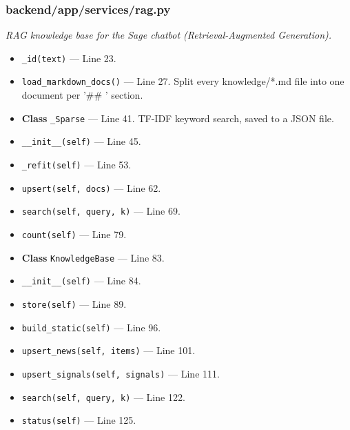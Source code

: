 \subsubsection*{backend/app/services/rag.py}
\textit{RAG knowledge base for the Sage chatbot (Retrieval-Augmented Generation).}
\begin{itemize}[nosep,leftmargin=1.5em]
\item \texttt{\_\allowbreak{}id(\allowbreak{}text)} --- Line 23.
\item \texttt{load\_\allowbreak{}markdown\_\allowbreak{}docs(\allowbreak{})} --- Line 27. Split every knowledge/*.md file into one document per '\#\# ' section.
\item \textbf{Class} \texttt{\_\allowbreak{}Sparse} --- Line 41. TF-IDF keyword search, saved to a JSON file.
\item \hspace*{1em}\texttt{\_\allowbreak{}\_\allowbreak{}init\_\allowbreak{}\_\allowbreak{}(\allowbreak{}self)} --- Line 45.
\item \hspace*{1em}\texttt{\_\allowbreak{}refit(\allowbreak{}self)} --- Line 53.
\item \hspace*{1em}\texttt{upsert(\allowbreak{}self,\allowbreak{} docs)} --- Line 62.
\item \hspace*{1em}\texttt{search(\allowbreak{}self,\allowbreak{} query,\allowbreak{} k)} --- Line 69.
\item \hspace*{1em}\texttt{count(\allowbreak{}self)} --- Line 79.
\item \textbf{Class} \texttt{KnowledgeBase} --- Line 83.
\item \hspace*{1em}\texttt{\_\allowbreak{}\_\allowbreak{}init\_\allowbreak{}\_\allowbreak{}(\allowbreak{}self)} --- Line 84.
\item \hspace*{1em}\texttt{store(\allowbreak{}self)} --- Line 89.
\item \hspace*{1em}\texttt{build\_\allowbreak{}static(\allowbreak{}self)} --- Line 96.
\item \hspace*{1em}\texttt{upsert\_\allowbreak{}news(\allowbreak{}self,\allowbreak{} items)} --- Line 101.
\item \hspace*{1em}\texttt{upsert\_\allowbreak{}signals(\allowbreak{}self,\allowbreak{} signals)} --- Line 111.
\item \hspace*{1em}\texttt{search(\allowbreak{}self,\allowbreak{} query,\allowbreak{} k)} --- Line 122.
\item \hspace*{1em}\texttt{status(\allowbreak{}self)} --- Line 125.
\end{itemize}
